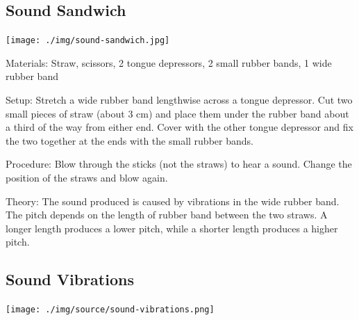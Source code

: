 \begin{multicols}{2}
\columnbreak

\subsection{Sound Sandwich}

\begin{center}
\texttt{[image: ./img/sound-sandwich.jpg]}
\end{center}

\begin{description*}
\item[Materials:]{Straw, scissors, 2 tongue depressors, 2 small rubber bands, 1 wide rubber band}
\item[Setup:]{Stretch a wide rubber band lengthwise across a tongue depressor. Cut two small pieces of straw (about 3 cm) and place them under the rubber band about a third of the way from either end. Cover with the other tongue depressor and fix the two together at the ends with the small rubber bands.}
\item[Procedure:]{Blow through the sticks (not the straws) to hear a sound. Change the position of the straws and blow again.}
\item[Theory:]{The sound produced is caused by vibrations in the wide rubber band. The pitch depends on the length of rubber band between the two straws. A longer length produces a lower pitch, while a shorter length produces a higher pitch.}
\end{description*}

\subsection{Sound Vibrations}

\begin{center}
\texttt{[image: ./img/source/sound-vibrations.png]}
\end{center}


\end{multicols}
